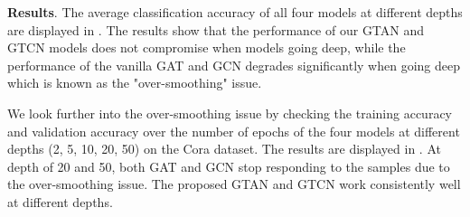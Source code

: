 \documentclass[lettersize,journal]{IEEEtran}
\theoremstyle{plain}
\theoremstyle{definition}
\theoremstyle{remark}
\begin{document}
\textbf{Results}. The average classification accuracy of all four models at different depths are displayed in . The results show that the performance of our GTAN and GTCN models does not compromise when models going deep, while the performance of the vanilla GAT and GCN degrades significantly when going deep which is known as the "over-smoothing" issue.

We look further into the over-smoothing issue by checking the training accuracy and validation accuracy over the number of epochs of the four models at different depths (2, 5, 10, 20, 50) on the Cora dataset. The results are displayed in . At depth of 20 and 50, both GAT and GCN stop responding to the samples due to the over-smoothing issue. The proposed GTAN and GTCN work consistently well at different depths.
\end{document}
